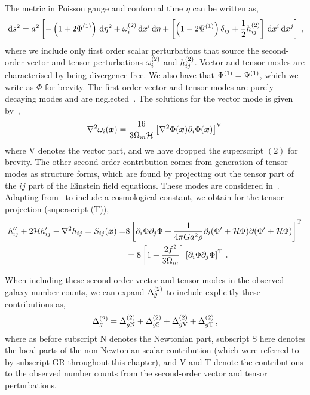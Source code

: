 The metric in Poisson gauge and conformal time $\eta$ can be written as, 
\begin{equation}
	\,\mathrm{d} s^2 = a^2 \left[ - \left( 1 + 2 \Phi^{(1)}  \right) \,\mathrm{d} \eta^2 + \omega^{(2)}_i \,\mathrm{d} x^i \,\mathrm{d}\eta + \left[ \left( 1 - 2 \Psi^{(1)} \right) \delta_{ij} + \frac{1}{2} h_{ij}^{(2)} \right] \,\mathrm{d} x^i \,\mathrm{d} x^j \right]\,,
\end{equation}
where we include only first order scalar perturbations that source the second-order vector and tensor perturbations $\omega_i^{(2)}$ and $h_{ij}^{(2)}$. Vector and tensor modes are characterised by being divergence-free. We also have that $\Phi^{(1)} = \Psi^{(1)}$, which we write as $\Phi$ for brevity.
The first-order vector and tensor modes are purely decaying modes and are neglected~\cite{Saga:2015apa,Bojowald:2007hv,Dai:2013kra}. The solutions for the vector mode is given by~\cite{Lu:2008ju}, 
\begin{equation}
	\nabla^2 \omega_i(\bm {x}) = \frac{16}{3 \Omega_m \mathcal{H}} \left[ \nabla^2 \Phi(\bm {x}) \partial_i \Phi(\bm {x}) \right]^\mathrm{V}\,
\end{equation}
where V denotes the vector part, and we have dropped the superscript $(2)$ for brevity. The other second-order contribution comes from generation of tensor modes as structure forms, which are found by projecting out the tensor part of the $ij$ part of the Einstein field equations. These modes are considered in~\cite{Tomita:2005et,Mollerach:2003nq,Ananda:2006af,Baumann:2007zm,Andrianomena:2014sya,Saga:2015apa,Matarrese:1993zf,Noh:2004bc,Malik:2008im,Hwang:2012aa,Rampf:2013dxa,Osano:2015pea,Rampf:2014mga}. Adapting from~\cite{Baumann:2007zm} to include a cosmological constant, we obtain for the tensor projection (superscript (T)),
\begin{align}
	h_{ij}'' + 2 \mathcal{H} h_{ij}' - \nabla^2 h_{ij} = S_{ij}(\bm {x}) =& 8 \left[ \partial_i \Phi \partial_j \Phi + \frac{1}{4 \pi G a^2 \rho} \partial_i (\Phi' + \mathcal{H} \Phi) \partial (\Phi' + \mathcal{H} \Phi) \right]^\mathrm{T} \\
	&= 8 \left[ 1 + \frac{2 f^2}{3 \Omega_m } \right] \left[ \partial_i \Phi \partial_j \Phi \right]^\mathrm{T}\,.
\end{align}

When including these second-order vector and tensor modes in the observed galaxy number counts, we can expand $\Delta_g^{(2)}$ to include explicitly these contributions as, 
\begin{equation}
	\Delta_g^{(2)} = \Delta_{g\mathrm{N}}^{(2)} + \Delta_{g\mathrm{S}}^{(2)} + \Delta_{g\mathrm{V}}^{(2)} + \Delta_{g\mathrm{T}}^{(2)}\,,
\end{equation}
where as before subscript N denotes the Newtonian part, subscript S here denotes the local parts of the non-Newtonian scalar contribution (which were referred to by subscript GR throughout this chapter), and V and T denote the contributions to the observed number counts from the second-order vector and tensor perturbations. 

